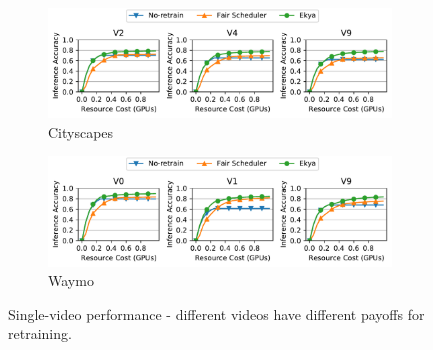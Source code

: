 
\begin{figure}
  \centering
  \begin{subfigure}[t]{\linewidth}
    \centering
    \includegraphics[width=\linewidth]{results/singlecam/singlecam_acc_vs_cost_golden_cityscapes.pdf} 
    \caption{Cityscapes}
    \label{fig:singlecam-cities-cityscapes-golden}
  \end{subfigure}
  \hfill
  \begin{subfigure}[t]{\linewidth}
    \centering
    \includegraphics[width=\linewidth]{results/singlecam/singlecam_acc_vs_cost_golden_waymo.pdf}
    \caption{Waymo}
    \label{fig:singlecam-cities-waymo-golden}
  \end{subfigure}
  \caption{Single-video performance - different videos have different payoffs for retraining.}%
  \label{fig:singlecam-cities}
\end{figure}


